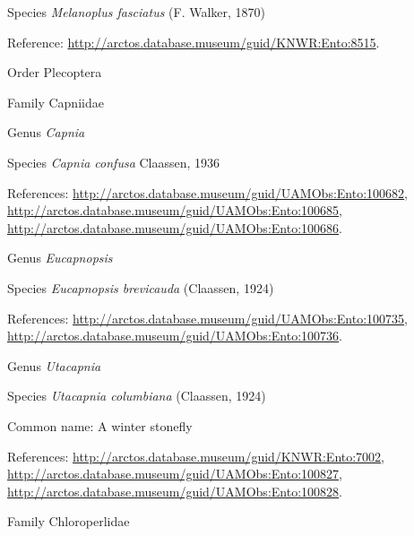 \documentclass[9pt, article]{memoir}
\begin{document}
\begin{multicols}{2}
\vspace{6pt}\noindent\hspace{36pt}Species \textit{Melanoplus fasciatus} (F. Walker, 1870)


Reference: 
\url{http://arctos.database.museum/guid/KNWR:Ento:8515}.

\vspace{6pt}\noindent\hspace{18pt}Order Plecoptera


\vspace{6pt}\noindent\hspace{24pt}Family Capniidae


\vspace{6pt}\noindent\hspace{30pt}Genus \textit{Capnia}


\vspace{6pt}\noindent\hspace{36pt}Species \textit{Capnia confusa} Claassen, 1936


References: 
\url{http://arctos.database.museum/guid/UAMObs:Ento:100682}, 
\url{http://arctos.database.museum/guid/UAMObs:Ento:100685}, 
\url{http://arctos.database.museum/guid/UAMObs:Ento:100686}.

\vspace{6pt}\noindent\hspace{30pt}Genus \textit{Eucapnopsis}


\vspace{6pt}\noindent\hspace{36pt}Species \textit{Eucapnopsis brevicauda} (Claassen, 1924)


References: 
\url{http://arctos.database.museum/guid/UAMObs:Ento:100735}, 
\url{http://arctos.database.museum/guid/UAMObs:Ento:100736}.

\vspace{6pt}\noindent\hspace{30pt}Genus \textit{Utacapnia}


\vspace{6pt}\noindent\hspace{36pt}Species \textit{Utacapnia columbiana} (Claassen, 1924)


Common name: A winter stonefly

References: 
\url{http://arctos.database.museum/guid/KNWR:Ento:7002}, 
\url{http://arctos.database.museum/guid/UAMObs:Ento:100827}, 
\url{http://arctos.database.museum/guid/UAMObs:Ento:100828}.

\vspace{6pt}\noindent\hspace{24pt}Family Chloroperlidae



\end{multicols}
\end{document}
